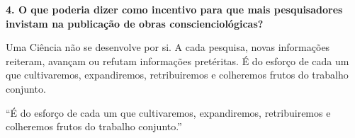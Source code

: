 \documentclass{gescons}
\begin{document}
\begin{multicols}{2}
\textbf{4. O que poderia dizer como incentivo para que mais pesquisadores invistam na publicação de obras conscienciológicas?}

Uma Ciência não se desenvolve por si. A cada pesquisa, novas informações reiteram, avançam ou refutam informações pretéritas. É do esforço de cada um que cultivaremos, expandiremos, retribuiremos e colheremos frutos do trabalho conjunto.


\begin{pullquote}
``É do esforço de cada um que cultivaremos, expandiremos, retribuiremos e colheremos frutos do trabalho conjunto.''
\end{pullquote}

    
    \end{multicols}
\end{document}
